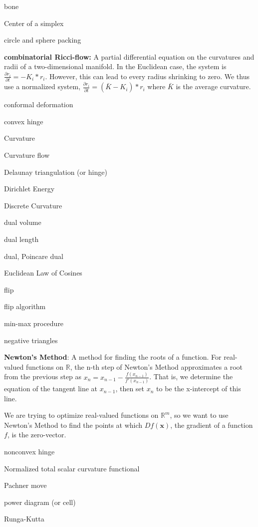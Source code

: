 \documentclass{article}
\begin{document}
bone

Center of a simplex

circle and sphere packing \newline

\textbf{combinatorial Ricci-flow:}
	A partial differential equation on the curvatures and radii of a two-dimensional manifold. In the Euclidean case, the system is $\frac{\partial r_i }{\partial t} = -K_i * r_i$. However, this can lead to every radius shrinking to zero. We thus use a normalized system, $\frac{\partial r_i }{\partial t} = (\bar{K} - K_i) * r_i$ where $\bar{K}$ is the average curvature. \newline

conformal deformation

convex hinge

Curvature

Curvature flow

Delaunay triangulation (or hinge)

Dirichlet Energy

Discrete Curvature

dual volume

dual length

dual, Poincare dual

Euclidean Law of Cosines

flip

flip algorithm

min-max procedure

negative triangles

\textbf{Newton's Method}: A method for finding the roots of a function. For real-valued functions on $\mathbb{R}$, the n-th step of Newton's Method approximates a root from the previous step as $x_n = x_{n-1} - \frac{f(x_{n-1})}{f'(x_{n-1})}$. That is, we determine the equation of the tangent line at $x_{n-1}$, then set $x_n$ to be the x-intercept of this line. \newline

\noindent We are trying to optimize real-valued functions on $\mathbb{R}^m$, so we want to use Newton's Method to find the points at which $Df(\mathbf{x})$, the gradient of a function $f$, is the zero-vector.

nonconvex hinge

Normalized total scalar curvature functional

Pachner move

power diagram (or cell)

Runga-Kutta
\end{document}
